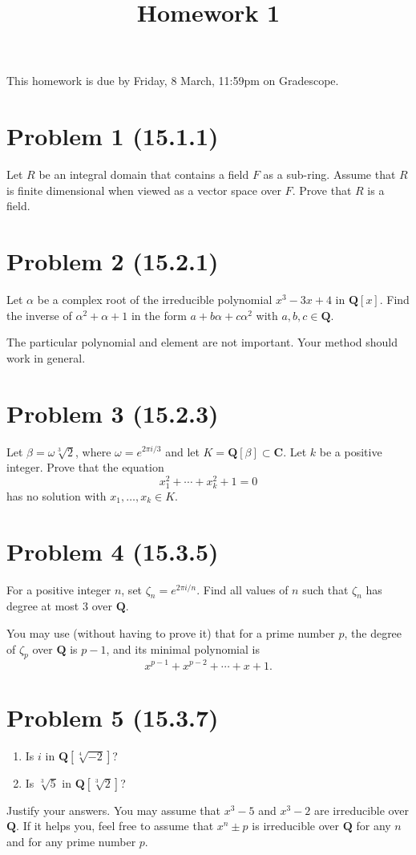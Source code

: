 \documentclass{amsart}
\date{}
\title{Homework 1}
\begin{document}
\maketitle
This homework is due by Friday, 8 March, 11:59pm on Gradescope.

\section{Problem 1 (15.1.1)}
\label{sec:orgdc0fd99}
Let \(R\) be an integral domain that contains a field \(F\) as a sub-ring.
Assume that \(R\) is finite dimensional when viewed as a vector space over \(F\).
Prove that \(R\) is a field.

\section{Problem 2 (15.2.1)}
\label{sec:org9fd104c}
Let \(\alpha\) be a complex root of the irreducible polynomial \(x^{3}-3x+4\) in \(\mathbf{Q}[x]\).
Find the inverse of \(\alpha^2+\alpha+1\) in the form \(a + b \alpha + c \alpha^{2}\) with \(a, b, c \in \mathbf{Q}\).

The particular polynomial and element are not important.
Your method should work in general.


\section{Problem 3 (15.2.3)}
\label{sec:org762f640}
Let \(\beta = \omega \sqrt[3]{2}\), where \(\omega = e^{2\pi i / 3}\) and let \(K = \mathbf{Q}[\beta] \subset \mathbf{C}\).
Let \(k\) be a positive integer.
Prove that the equation
\[ x_1^2 + \cdots + x_k^2 + 1 = 0\]
has no solution with \(x_1, \dots, x_{k} \in K\).


\section{Problem 4 (15.3.5)}
\label{sec:org5dc680e}
For a positive integer \(n\), set \(\zeta_{n} = e^{2\pi i / n}\).
Find all values of \(n\) such that \(\zeta_{n}\) has degree at most 3 over \(\mathbf{Q}\).

You may use (without having to prove it) that for a prime number \(p\), the degree of \(\zeta_p\) over \(\mathbf{Q}\) is \(p-1\), and its minimal polynomial is
\[x^{p-1}+ x^{p-2} + \cdots + x + 1.\]

\section{Problem 5 (15.3.7)}
\label{sec:orga2d7e59}
\begin{enumerate}
\item Is \(i\) in \(\mathbf{Q}[\sqrt[4]{-2}]\)?
\item Is \(\sqrt[3]5\) in \(\mathbf{Q}[\sqrt[3]2]\)?
\end{enumerate}

Justify your answers.
You may assume that \(x^3-5\) and \(x^3-2\) are irreducible over \(\mathbf{Q}\).  
If it helps you, feel free to assume that \(x^n \pm p\) is irreducible over \(\mathbf{Q}\) for any \(n\) and for any prime number \(p\).
\end{document}
